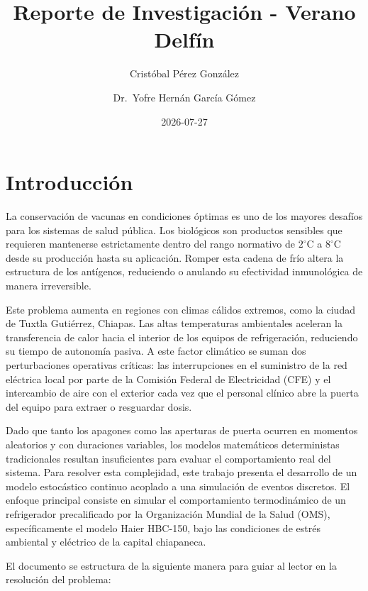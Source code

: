 \documentclass[
  spanish,
  letterpaper,
  DIV=11,
  numbers=noendperiod]{scrreprt}
\title{Reporte de Investigación - Verano Delfín}
\author{Cristóbal Pérez González \and Dr.~Yofre Hernán García Gómez}
\date{2026-07-27}
\renewcommand*\contentsname{Tabla de contenidos}
\newcommand\contentsname{Tabla de contenidos}
\theoremstyle{plain}
\theoremstyle{definition}
\theoremstyle{remark}
\begin{document}
\maketitle

\renewcommand*\contentsname{Tabla de contenidos}
{
\hypersetup{linkcolor=}
\setcounter{tocdepth}{2}
\tableofcontents
}


\chapter{Introducción}\label{introducciuxf3n}

La conservación de vacunas en condiciones óptimas es uno de los mayores
desafíos para los sistemas de salud pública. Los biológicos son
productos sensibles que requieren mantenerse estrictamente dentro del
rango normativo de \(2^\circ\text{C}\) a \(8^\circ\text{C}\) desde su
producción hasta su aplicación. Romper esta cadena de frío altera la
estructura de los antígenos, reduciendo o anulando su efectividad
inmunológica de manera irreversible.

Este problema aumenta en regiones con climas cálidos extremos, como la
ciudad de Tuxtla Gutiérrez, Chiapas. Las altas temperaturas ambientales
aceleran la transferencia de calor hacia el interior de los equipos de
refrigeración, reduciendo su tiempo de autonomía pasiva. A este factor
climático se suman dos perturbaciones operativas críticas: las
interrupciones en el suministro de la red eléctrica local por parte de
la Comisión Federal de Electricidad (CFE) y el intercambio de aire con
el exterior cada vez que el personal clínico abre la puerta del equipo
para extraer o resguardar dosis.

Dado que tanto los apagones como las aperturas de puerta ocurren en
momentos aleatorios y con duraciones variables, los modelos matemáticos
deterministas tradicionales resultan insuficientes para evaluar el
comportamiento real del sistema. Para resolver esta complejidad, este
trabajo presenta el desarrollo de un modelo estocástico continuo
acoplado a una simulación de eventos discretos. El enfoque principal
consiste en simular el comportamiento termodinámico de un refrigerador
precalificado por la Organización Mundial de la Salud (OMS),
específicamente el modelo Haier HBC-150, bajo las condiciones de estrés
ambiental y eléctrico de la capital chiapaneca.

El documento se estructura de la siguiente manera para guiar al lector
en la resolución del problema:
\end{document}
